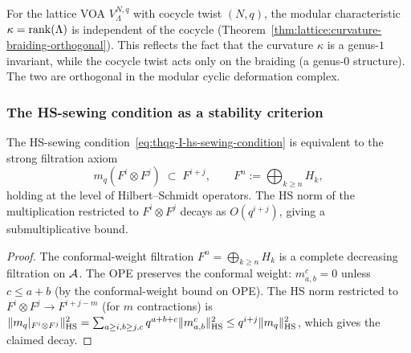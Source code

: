 \begin{remark}
\label{rem:thqg-I-lattice-ortho}
For the lattice VOA $V_\Lambda^{N,q}$ with cocycle twist $(N,q)$, the modular characteristic $\kappa = \operatorname{rank}(\Lambda)$ is independent of the cocycle (Theorem~\ref{thm:lattice:curvature-braiding-orthogonal}). This reflects the fact that the curvature $\kappa$ is a genus-$1$ invariant, while the cocycle twist acts only on the braiding (a genus-$0$ structure). The two are orthogonal in the modular cyclic deformation complex.
\end{remark}

\subsubsection{The HS-sewing condition as a stability criterion}

\begin{proposition}
\label{prop:thqg-I-hs-filtration}
The HS-sewing condition~\eqref{eq:thqg-I-hs-sewing-condition} is equivalent to the strong filtration axiom
\begin{equation}\label{eq:thqg-I-strong-filtration}
m_q(F^i \otimes F^j) \;\subset\; F^{i+j}, \qquad F^n := \bigoplus_{k \geq n} H_k,
\end{equation}
holding at the level of Hilbert--Schmidt operators. The HS norm of the multiplication restricted to $F^i \otimes F^j$ decays as $O(q^{i+j})$, giving a submultiplicative bound.
\end{proposition}

\begin{proof}
The conformal-weight filtration $F^n = \bigoplus_{k \geq n} H_k$ is a complete decreasing filtration on $\mathcal{A}$. The OPE preserves the conformal weight: $m^c_{a,b} = 0$ unless $c \leq a + b$ (by the conformal-weight bound on OPE). The HS norm restricted to $F^i \otimes F^j \to F^{i+j-m}$ (for $m$ contractions) is $\|m_q|_{F^i \otimes F^j}\|_{\operatorname{HS}}^2 = \sum_{a \geq i, b \geq j, c} q^{a+b+c} \|m^c_{a,b}\|_{\operatorname{HS}}^2 \leq q^{i+j} \|m_q\|_{\operatorname{HS}}^2$, which gives the claimed decay.
\end{proof}

